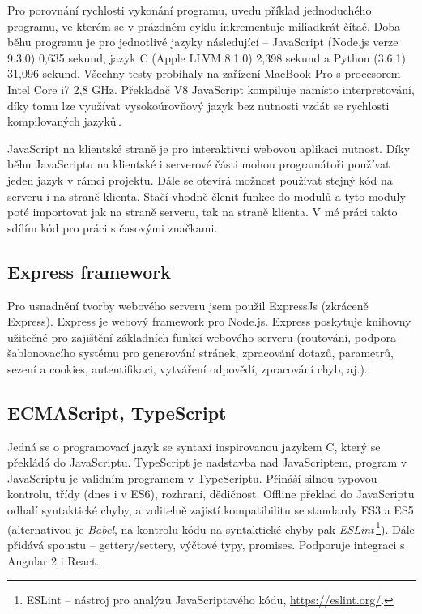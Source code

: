 Pro porovnání rychlosti vykonání programu, uvedu příklad jednoduchého programu, ve kterém se v prázdném cyklu inkrementuje miliadkrát čítač. Doba běhu programu je pro jednotlivé jazyky následující -- JavaScript (Node.js verze 9.3.0) 0,635 sekund, jazyk C (Apple LLVM 8.1.0) 2,398 sekund a Python (3.6.1) 31,096 sekund. Všechny testy probíhaly na zařízení MacBook Pro s procesorem Intel Core i7 2,8 GHz. Překladač V8 JavaScript kompiluje namísto interpretování, díky tomu lze využívat vysokoúrovňový jazyk bez nutnosti vzdát se rychlosti kompilovaných jazyků\,\cite{MasteringNodejs}.

JavaScript na klientské straně je pro interaktivní webovou aplikaci nutnost. Díky běhu JavaScriptu na klientské i serverové části mohou programátoři používat jeden jazyk v rámci projektu. Dále se otevírá možnost používat stejný kód na serveru i na straně klienta. Stačí vhodně členit funkce do modulů a tyto moduly poté importovat jak na straně serveru, tak na straně klienta. V mé práci takto sdílím kód pro práci s časovými značkami.

\subsection{Express framework}
Pro usnadnění tvorby webového serveru jsem použil ExpressJs (zkráceně Express). Express je webový framework pro Node.js. Express poskytuje knihovny užitečné pro zajištění základních funkcí webového serveru (routování, podpora šablonovacího systému pro generování stránek, zpracování dotazů, parametrů, sezení a cookies, autentifikaci, vytváření odpovědí, zpracování chyb, aj.).

\subsection{ECMAScript, TypeScript}
Jedná se o programovací jazyk se syntaxí inspirovanou jazykem C, který se překládá do JavaScriptu. TypeScript je nadstavba nad JavaScriptem, program v JavaScriptu je validním programem v TypeScriptu. Přináší silnou typovou kontrolu, třídy (dnes i v ES6), rozhraní, dědičnost. Offline překlad do JavaScriptu odhalí syntaktické chyby, a volitelně zajistí kompatibilitu se standardy ES3 a ES5 (alternativou je \textit{Babel}, na kontrolu kódu na syntaktické chyby pak \textit{ESLint}\,\footnote{ESLint -- nástroj pro analýzu JavaScriptového kódu, \url{https://eslint.org/}.}). Dále přidává spoustu  -- gettery/settery, výčtové typy, promises. Podporuje integraci s Angular 2 i React.

